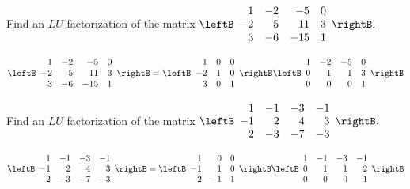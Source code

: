 \begin{enumialphparenastyle}
\begin{ex} Find an $LU$ factorization of the matrix $\leftB 
\begin{array}{rrrr}
1 & -2 & -5 & 0 \\ 
-2 & 5 & 11 & 3 \\ 
3 & -6 & -15 & 1
\end{array}
\rightB .$
\begin{sol}
\[
\leftB
\begin{array}{rrrr}
1 & -2 & -5 & 0 \\
-2 & 5 & 11 & 3 \\
3 & -6 & -15 & 1
\end{array}
\rightB = \leftB
\begin{array}{rrr}
1 & 0 & 0 \\
-2 & 1 & 0 \\
3 & 0 & 1
\end{array}
\rightB \leftB
\begin{array}{rrrr}
1 & -2 & -5 & 0 \\
0 & 1 & 1 & 3 \\
0 & 0 & 0 & 1
\end{array}
\rightB 
\]
\end{sol}
\end{ex}

\begin{ex} Find an $LU$ factorization of the matrix $\leftB 
\begin{array}{rrrr}
1 & -1 & -3 & -1 \\ 
-1 & 2 & 4 & 3 \\ 
2 & -3 & -7 & -3
\end{array} \rightB .$
\begin{sol}
\[
\leftB
\begin{array}{rrrr}
1 & -1 & -3 & -1 \\
-1 & 2 & 4 & 3 \\
2 & -3 & -7 & -3
\end{array} \rightB = \leftB
\begin{array}{rrr}
1 & 0 & 0 \\
-1 & 1 & 0 \\
2 & -1 & 1
\end{array}
\rightB \leftB
\begin{array}{rrrr}
1 & -1 & -3 & -1 \\
0 & 1 & 1 & 2 \\
0 & 0 & 0 & 1
\end{array}
\rightB 
\]
\end{sol}
\end{ex}


\end{enumialphparenastyle}
